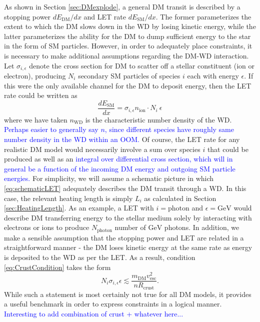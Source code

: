 \documentclass[twocolumn,showpacs,preprintnumbers,amsmath,amssymb,prd]{revtex4}
\newcommand{\GeV}{\text{GeV}}
\begin{document}
As shown in Section \ref{sec:DMexplode}, a general DM transit is described by a stopping power $d E_\text{DM}/dx$ and LET rate $dE_\text{SM} /dx$. The former parameterizes the extent to which the DM slows down in the WD by losing kinetic energy, while the latter parameterizes the ability for the DM to dump sufficient energy to the star in the form of SM particles. However, in order to adequately place constraints, it is necessary to make additional assumptions regarding the DM-WD interaction. Let $\sigma_{i,\epsilon}$ denote the cross section for DM to scatter off a stellar constituent (ion or electron), producing $N_i$ secondary SM particles of species $i$ each with energy $\epsilon$. If this were the only available channel for the DM to deposit energy, then the LET rate could be written as
\begin{equation}
\label{eq:schematicLET}
\frac{d E_\text{SM}}{d x} = \sigma_{i,\epsilon} n_\text{ion} \cdot N_i ~\epsilon
\end{equation}
where we have taken $n_\text{WD}$ is the characteristic number density of the WD. \textcolor{blue}{Perhaps easier to generally say $n$, since different species have roughly same number density in the WD within an OOM.} Of course, the LET rate for any realistic DM model would necessarily involve a sum over species $i$ that could be produced as well as an \textcolor{blue}{integral over differential cross section, which will in general be a function of the incoming DM energy and outgoing SM particle energies.} For simplicity, we will assume a schematic picture in which \eqref{eq:schematicLET} adequately describes the DM transit through a WD. In this case, the relevant heating length is simply $L_i$ as calculated in Section \ref{sec:HeatingLength}. As an example, a LET with $i = \text{photon}$ and $\epsilon = \GeV$ would describe DM transferring energy to the stellar medium solely by interacting with electrons or ions to produce $N_\text{photon}$ number of $\GeV$ photons. In addition, we make a sensible assumption that the stopping power and LET are related in a straightforward manner - the DM loses kinetic energy at the same rate as energy is deposited to the WD as per the LET. As a result, condition \eqref{eq:CrustCondition} takes the form
\begin{equation}
N_i \sigma_{i,\epsilon} \epsilon \lesssim \frac{m_\text{DM}v_\text{esc}^2}{n R_\text{crust}}.
\end{equation}
While such a statement is most certainly not true for all DM models, it provides a useful benchmark in order to express constraints in a logical manner. \textcolor{blue}{Interesting to add combination of crust + whatever here...}
\end{document}
